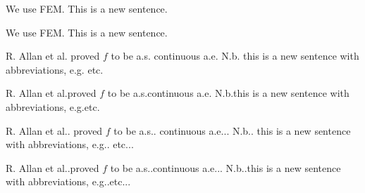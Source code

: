 \documentclass[%
varwidth=16.5cm,%
border=5pt%
]{standalone}
\makeatletter
\newcommand{\abbr}[1]{#1\@ifnextchar.{}{.\@}} %
\newcommand{\myetal}{\abbr{et al}}
\newcommand{\myas}{\abbr{a.s}}
\newcommand{\myae}{\abbr{a.e}}
\newcommand{\myNb}{\abbr{N.b}}
\newcommand{\myeg}{\abbr{e.g}}
\newcommand{\myetc}{\abbr{etc}}
\newcommand{\abbrx}[1]{#1\@ifnextchar.{}{.\@\xspace}}
\newcommand{\abbrxetal}{\abbrx{et al}}
\newcommand{\abbrxas}{\abbrx{a.s}}
\newcommand{\abbrxae}{\abbrx{a.e}}
\newcommand{\abbrxNb}{\abbrx{N.b}}
\newcommand{\abbrxeg}{\abbrx{e.g}}
\newcommand{\abbrxetc}{\abbrx{etc}}
\makeatother
\begin{document}
{\color{Firebrick3}%
  We use FEM. This is a new sentence.%
}

We use FEM\@. This is a new sentence.

{\color{Firebrick3}%
  R. Allan et al. proved $f$ to be a.s. continuous a.e. N.b. this is a new sentence with abbreviations, e.g. etc.%
}

R. Allan et al.\@ proved $f$ to be a.s.\@ continuous a.e. N.b.\@ this is a new sentence with abbreviations, e.g.\@ etc.

R. Allan \myetal{} proved $f$ to be \myas{} continuous \myae. \myNb{} this is a new sentence with abbreviations, \myeg{} \myetc. 

R. Allan \abbrxetal proved $f$ to be \abbrxas continuous \abbrxae. \abbrxNb this is a new sentence with abbreviations, \abbrxeg \abbrxetc.
\end{document}
